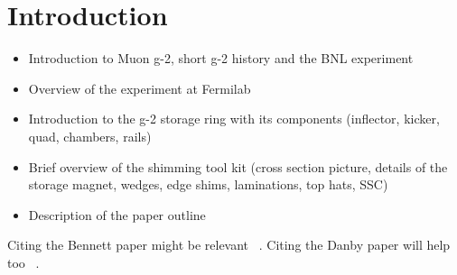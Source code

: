\section{Introduction}
\label{sec:Introduction}
\begin{itemize}
\item Introduction to Muon g-2, short g-2 history and the BNL experiment
\item Overview of the experiment at Fermilab
\item Introduction to the g-2 storage ring with its components (inflector, kicker, quad, chambers, rails)
\item Brief overview of the shimming tool kit (cross section picture, details of the storage magnet, wedges, edge shims, laminations, top hats, SSC)
\item Description of the paper outline
\end{itemize}

Citing the Bennett paper might be relevant ~\cite{Bennett2006}.
Citing the Danby paper will help too ~\cite{Danby2001}.

